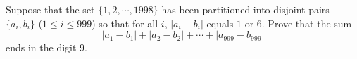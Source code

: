 Suppose that the set $\{1,2,\cdots, 1998\}$ has been partitioned into disjoint pairs $\{a_i,b_i\}$ ($1\leq i\leq 999$) so that for all $i$,  $|a_i-b_i|$ equals $1$ or $6$. Prove that the sum \[ |a_1-b_1|+|a_2-b_2|+\cdots +|a_{999}-b_{999}|  \] ends in the digit $9$.